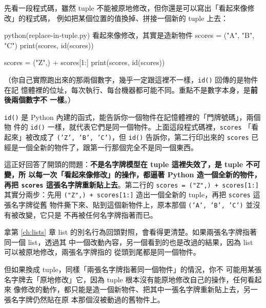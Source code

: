 先看一段程式碼，雖然 tuple 不能被原地修改，但你還是可以寫出「看起來像修改」的程式碼，
例如把某個位置的值換掉、拼接一個新的 tuple 上去：

\begin{example}{python}{(replace-in-tuple.py) 看起來像修改，其實是造新物件}
scores = ("A", "B", "C")
print(scores, id(scores))

scores = ("Z",) + scores[1:]
print(scores, id(scores))
\end{example}


（你自己實際跑出來的那兩個數字，幾乎一定跟這裡不一樣，\texttt{id()} 回傳的是物件在記
憶體裡的位址，每次執行、每台機器都可能不同。重點不是數字本身，是\textbf{前後兩個數字不
一樣}。）

\texttt{id()} 是 Python 內建的函式，能告訴你一個物件在記憶體裡的「門牌號碼」，兩個物
件的 \texttt{id()} 一樣，就代表它們是同一個物件。上面這段程式碼裡，\texttt{scores}
「看起來」被改成了 \texttt{('Z', 'B', 'C')}，但 \texttt{id()} 告訴你，第二行印出來的
\texttt{scores} 已經是一個全新的物件了，跟第一行那個完全不是同一個東西。

這正好回答了開頭的問題：\textbf{不是名字牌模型在 tuple 這裡失效了，是 tuple 不可變，所
以每一次「看起來像修改」的操作，都逼著 Python 造一個全新的物件，再把 \texttt{scores}
這張名字牌重新貼上去}。第二行的 \texttt{scores = ("Z",) + scores[1:]} 其實分兩步：先用
\texttt{("Z",) + scores[1:]} 造出一個全新的 tuple，再把 \texttt{scores} 這張名字牌從舊
物件撕下來、貼到這個新物件上，原本那個 \texttt{('A', 'B', 'C')} 並沒有被改變，它只是
不再被任何名字牌指著而已。

拿第 \ref{ch:lists} 章 list 的別名行為回頭對照，會看得更清楚。如果兩張名字牌指著同一個 list，透過其
中一個改動內容，另一個看到的也是改過的結果，因為 list 可以被原地修改，兩張名字牌指的
從頭到尾都是同一個物件。

但如果換成 tuple，同樣「兩張名字牌指著同一個物件」的情況，你不
可能用某張名字牌去「原地修改」它，因為 tuple 根本沒有能原地修改自己的操作，任何看起來
像修改的動作，都只能是造一個新物件、把其中一張名字牌重新貼上去，另一張名字牌仍然貼在原
本那個沒被動過的舊物件上。


